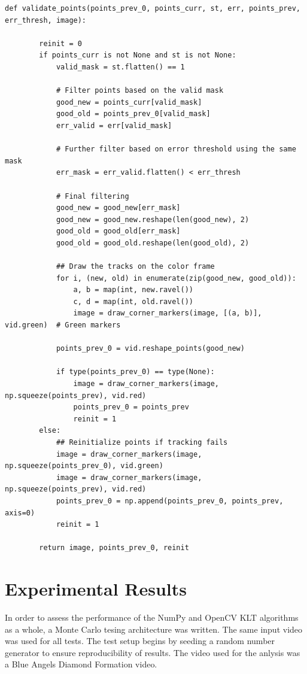 \documentclass[11pt, conference, letterpaper]{IEEEtran}
\begin{document}
\begin{lstlisting}[style=python, caption={\texttt{validate\_points}}, label={lst:valpoints}]
    def validate_points(points_prev_0, points_curr, st, err, points_prev, err_thresh, image):
        
        reinit = 0
        if points_curr is not None and st is not None:                
            valid_mask = st.flatten() == 1
            
            # Filter points based on the valid mask
            good_new = points_curr[valid_mask]
            good_old = points_prev_0[valid_mask]
            err_valid = err[valid_mask]

            # Further filter based on error threshold using the same mask
            err_mask = err_valid.flatten() < err_thresh

            # Final filtering
            good_new = good_new[err_mask]
            good_new = good_new.reshape(len(good_new), 2)
            good_old = good_old[err_mask]
            good_old = good_old.reshape(len(good_old), 2)
            
            ## Draw the tracks on the color frame
            for i, (new, old) in enumerate(zip(good_new, good_old)):
                a, b = map(int, new.ravel())
                c, d = map(int, old.ravel())
                image = draw_corner_markers(image, [(a, b)], vid.green)  # Green markers

            points_prev_0 = vid.reshape_points(good_new)
            
            if type(points_prev_0) == type(None):
                image = draw_corner_markers(image, np.squeeze(points_prev), vid.red)
                points_prev_0 = points_prev
                reinit = 1
        else:
            ## Reinitialize points if tracking fails
            image = draw_corner_markers(image, np.squeeze(points_prev_0), vid.green)
            image = draw_corner_markers(image, np.squeeze(points_prev), vid.red)
            points_prev_0 = np.append(points_prev_0, points_prev, axis=0)
            reinit = 1

        return image, points_prev_0, reinit
\end{lstlisting}
\twocolumn

\section{Experimental Results}
In order to assess the performance of the NumPy and OpenCV KLT algorithms as a whole, a Monte Carlo tesing architecture was written. The same input video was used for all tests. The test setup begins by seeding a random number generator to ensure reproducibility of results. The video used for the anlysis was a Blue Angels Diamond Formation video.
\end{document}
